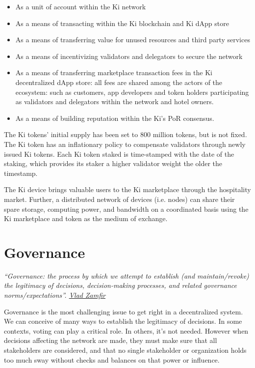 \begin{itemize}
\item As a unit of account within the Ki network
\item As a means of transacting within the Ki blockchain and Ki dApp store
\item As a means of transferring value for unused resources and third party services
\item As a means of incentivizing validators and delegators to secure the network
\item As a means of transferring marketplace transaction fees in the Ki decentralized dApp store: all fees are shared among the actors of the ecosystem: such as customers, app developers and token holders participating as validators and delegators within the network and hotel owners.
\item As a means of building reputation within the Ki's PoR consensus.
\end{itemize}

The Ki tokens' initial supply has been set to 800 million tokens, but is not fixed. The Ki token has an inflationary policy to compensate validators through newly issued Ki tokens. Each Ki token staked is time-stamped with the date of the staking, which provides its staker a higher validator weight the older the timestamp. 

The Ki device brings valuable users to the Ki marketplace through the hospitality market. Further, a distributed network of devices (i.e. nodes) can share their spare storage, computing power, and bandwidth on a coordinated basis using the Ki marketplace and token as the medium of exchange.


\section{Governance}
\textit{``Governance: the process by which we attempt to establish (and maintain/revoke) the legitimacy of decisions, decision-making processes, and related governance norms/expectations''. \href{https://twitter.com/VladZamfir/status/974026020234948608}{Vlad Zamfir}} 
		
					
Governance is the most challenging issue to get right in a decentralized system. We can conceive of many ways to establish the legitimacy of decisions. In some contexts, voting can play a critical role. In others, it's not needed. However when decisions affecting the network are made, they must make sure that all stakeholders are considered, and that no single stakeholder or organization holds too much sway without checks and balances on that power or influence.
					
